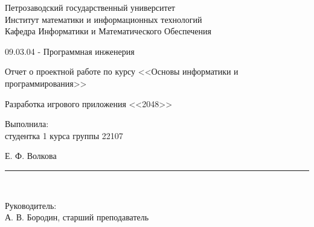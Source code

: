 \documentclass[a4paper,12pt]{article}
\newcommand{\myrule}[1]{\rule{#1}{0.4pt}}
\newcommand{\sign}[2][~]{{\small\myrule{#2}\\[-0.7em]\makebox[#2]{\it #1}}}
\renewcommand{\baselinestretch}{1.50}
\begin{document}

\thispagestyle{empty}
\begin{center}


\renewcommand{\baselinestretch}{1}
{\large
{\sc Петрозаводский государственный университет\\
Институт математики и информационных технологий\\
	Кафедра Информатики и Математического Обеспечения
}
}

\end{center}


\begin{center}
%
%
09.03.04 - Программная инженерия \\
%
% 
\end{center}

\vfill

\begin{center}
{\normalsize Отчет о проектной работе по курсу <<Основы информатики и программирования>>} \\

\medskip

	{\Large \sc Разработка игрового приложения <<2048>>} \\
\end{center}

\medskip

\begin{flushright}
\parbox{11cm}{%
\renewcommand{\baselinestretch}{1.2}
\normalsize
	Выполнила:\\
студентка 1 курса группы 22107
\begin{flushright}
	Е. Ф. Волкова \sign[подпись]{4cm}
\end{flushright}

Руководитель:\\
А. В. Бородин, старший преподаватель \\

}
\end{flushright}
\end{document}
